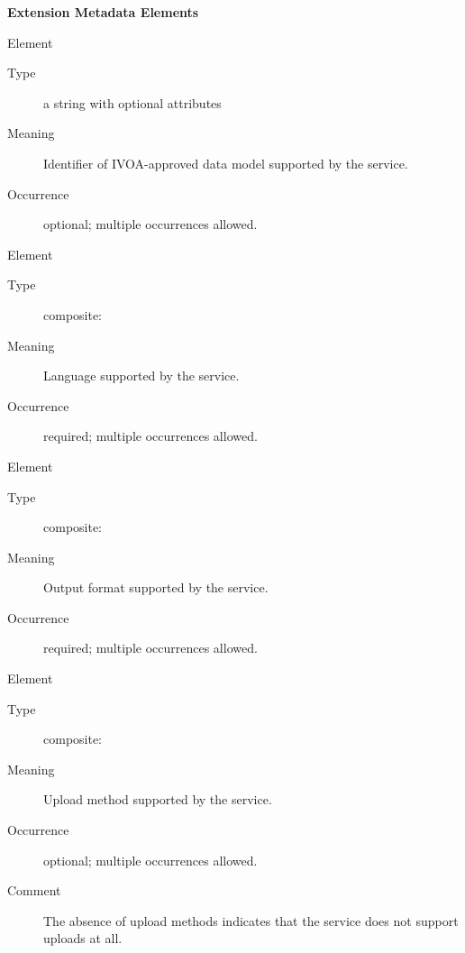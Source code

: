 \documentclass{ivoa}
\begin{document}
\vspace{0.5ex}\noindent\textbf{ Extension Metadata Elements}

\begingroup\small\begin{bigdescription}\item[Element \xmlel{dataModel}]
\begin{description}
\item[Type] a string with optional attributes
\item[Meaning] 
              Identifier of IVOA-approved data model supported by the 
              service.
              
\item[Occurrence] optional; multiple occurrences allowed.

\end{description}
\item[Element \xmlel{language}]
\begin{description}
\item[Type] composite: 
\item[Meaning] 
              Language supported by the service.
              
\item[Occurrence] required; multiple occurrences allowed.

\end{description}
\item[Element \xmlel{outputFormat}]
\begin{description}
\item[Type] composite: 
\item[Meaning] 
                Output format supported by the service.
              
\item[Occurrence] required; multiple occurrences allowed.

\end{description}
\item[Element \xmlel{uploadMethod}]
\begin{description}
\item[Type] composite: 
\item[Meaning] 
                Upload method supported by the service.
              
\item[Occurrence] optional; multiple occurrences allowed.
\item[Comment] 
                The absence of upload methods indicates
                that the service does not support uploads
                at all.
              


\end{description}
\end{bigdescription}
\end{document}
